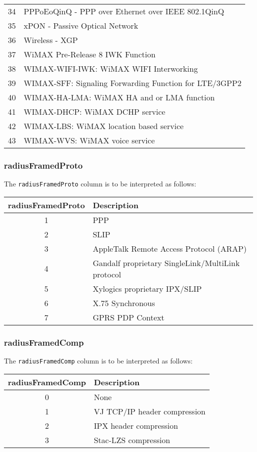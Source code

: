 \documentclass[documentation]{subfiles}
\begin{document}
\begin{longtable}{rl}
    34 & PPPoEoQinQ - PPP over Ethernet over IEEE 802.1QinQ\\
    35 & xPON - Passive Optical Network\\
    36 & Wireless - XGP\\
    37 & WiMAX Pre-Release 8 IWK Function\\
    38 & WIMAX-WIFI-IWK: WiMAX WIFI Interworking\\
    39 & WIMAX-SFF: Signaling Forwarding Function for LTE/3GPP2\\
    40 & WIMAX-HA-LMA: WiMAX HA and or LMA function\\
    41 & WIMAX-DHCP: WiMAX DCHP service\\
    42 & WIMAX-LBS: WiMAX location based service\\
    43 & WIMAX-WVS: WiMAX voice service\\
    \bottomrule
\end{longtable}

\subsubsection{radiusFramedProto}\label{radiusFramedProto}
The {\tt radiusFramedProto} column is to be interpreted as follows:
\begin{longtable}{cl}
    \toprule
    {\bf radiusFramedProto} & {\bf Description}\\
    \midrule\endhead%
    1 & PPP\\
    2 & SLIP\\
    3 & AppleTalk Remote Access Protocol (ARAP)\\
    4 & Gandalf proprietary SingleLink/MultiLink protocol\\
    5 & Xylogics proprietary IPX/SLIP\\
    6 & X.75 Synchronous\\
    7 & GPRS PDP Context\\
    \bottomrule
\end{longtable}

\subsubsection{radiusFramedComp}\label{radiusFramedComp}
The {\tt radiusFramedComp} column is to be interpreted as follows:
\begin{longtable}{cl}
    \toprule
    {\bf radiusFramedComp} & {\bf Description}\\
    \midrule\endhead%
    0 & None\\
    1 & VJ TCP/IP header compression\\
    2 & IPX header compression\\
    3 & Stac-LZS compression\\
    \bottomrule
\end{longtable}
\end{document}
